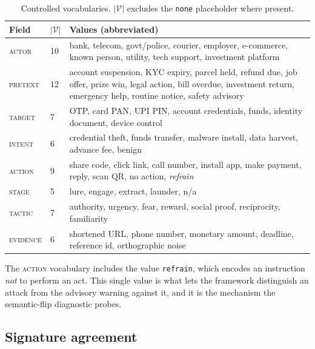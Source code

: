 \documentclass[11pt,a4paper]{article}
\begin{document}
\begin{table}[t]
\centering\small
\caption{Controlled vocabularies. $|\mathcal{V}|$ excludes the \texttt{none}
placeholder where present.}
\label{tab:vocab}
\begin{tabular}{@{}llp{7.4cm}@{}}
\toprule
\textbf{Field} & $|\mathcal{V}|$ & \textbf{Values (abbreviated)} \\
\midrule
\textsc{actor}    & 10 & bank, telecom, govt/police, courier, employer,
                         e-commerce, known person, utility, tech support,
                         investment platform \\
\textsc{pretext}  & 12 & account suspension, KYC expiry, parcel held, refund due,
                         job offer, prize win, legal action, bill overdue,
                         investment return, emergency help, routine notice,
                         safety advisory \\
\textsc{target}   & 7  & OTP, card PAN, UPI PIN, account credentials, funds,
                         identity document, device control \\
\textsc{intent}   & 6  & credential theft, funds transfer, malware install,
                         data harvest, advance fee, benign \\
\textsc{action}   & 9  & share code, click link, call number, install app,
                         make payment, reply, scan QR, no action, \emph{refrain} \\
\textsc{stage}    & 5  & lure, engage, extract, launder, n/a \\
\textsc{tactic}   & 7  & authority, urgency, fear, reward, social proof,
                         reciprocity, familiarity \\
\textsc{evidence} & 6  & shortened URL, phone number, monetary amount, deadline,
                         reference id, orthographic noise \\
\bottomrule
\end{tabular}
\end{table}

The \textsc{action} vocabulary includes the value \texttt{refrain}, which
encodes an instruction \emph{not} to perform an act. This single value is what
lets the framework distinguish an attack from the advisory warning against it,
and it is the mechanism the semantic-flip diagnostic probes.

\subsection{Signature agreement}
\end{document}
